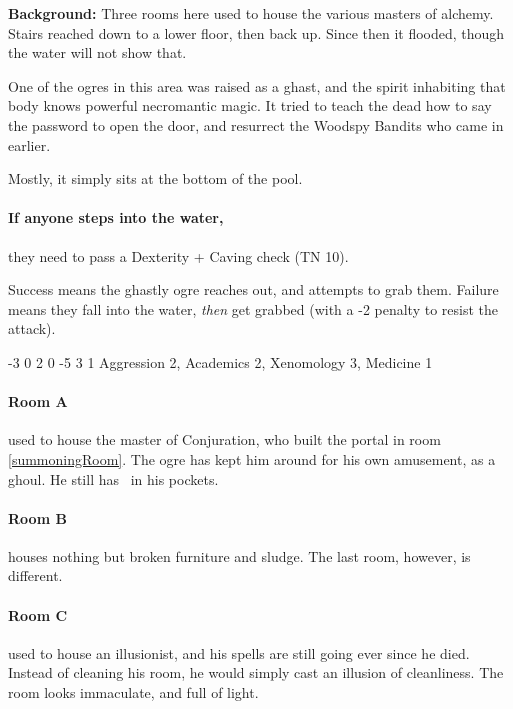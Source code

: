 \begin{multicols}{2}
\begin{boxtext}
\end{boxtext}

\textbf{Background:}
Three rooms here used to house the various masters of alchemy.
Stairs reached down to a lower floor, then back up.
Since then it flooded, though the water will not show that.

One of the ogres in this area was raised as a ghast, and the spirit inhabiting that body knows powerful necromantic magic.
It tried to teach the dead how to say the password to open the door, and resurrect the Woodspy Bandits who came in earlier.

Mostly, it simply sits at the bottom of the pool.

\paragraph{If anyone steps into the water,}
they need to pass a Dexterity + Caving check (TN 10).

Success means the ghastly ogre reaches out, and attempts to grab them.
Failure means they fall into the water, \emph{then} get grabbed (with a -2 penalty to resist the attack).

\label{undead_ogre}

  {-3}%
  {0}%
  {{2}%
  {0}%
  {-5}}%
  {3}%
  {1}%
  {Aggression 2, Academics 2, Xenomology 3, Medicine 1
  }%
  {\longsword}%
  {\addtocounter{xpbonus}{3}}

\paragraph{Room A} used to house the master of Conjuration, who built the portal in room \ref{summoningRoom}.
The ogre has kept him around for his own amusement, as a ghoul.
He still has \lootBig\ in his pockets.

\paragraph{Room B} houses nothing but broken furniture and sludge.
The last room, however, is different.

\paragraph{Room C} used to house an illusionist, and his spells are still going ever since he died.
Instead of cleaning his room, he would simply cast an illusion of cleanliness.
The room looks immaculate, and full of light.


\end{multicols}
